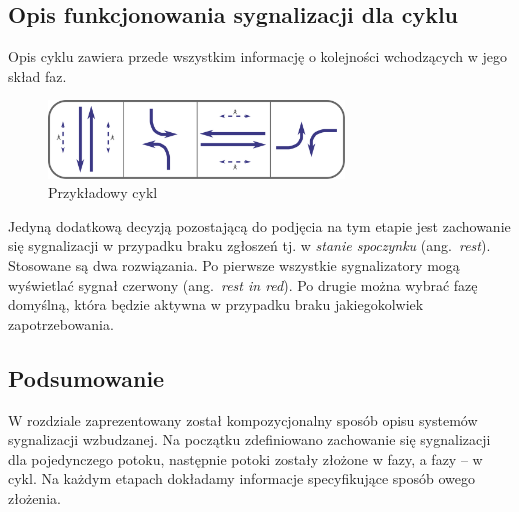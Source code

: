\documentclass{pracamgr}
\newcommand{\ang}[1]{(ang.~\emph{#1})}
\theoremstyle{plain}
\begin{document}
\subsection{Opis funkcjonowania sygnalizacji dla cyklu} Opis cyklu
zawiera przede wszystkim informację o kolejności wchodzących w jego
skład faz.
\begin{figure}[ht] \centering
  \includegraphics[width=0.7\textwidth]{img/signals-cycle-example}
  \caption{Przykładowy cykl}
\end{figure}
Jedyną dodatkową decyzją pozostającą do podjęcia na tym etapie jest
zachowanie się sygnalizacji w przypadku braku zgłoszeń tj. w
\emph{stanie spoczynku} \ang{rest}. Stosowane są dwa rozwiązania. Po
pierwsze wszystkie sygnalizatory mogą wyświetlać sygnał czerwony
\ang{rest in red}. Po drugie można wybrać fazę domyślną, która będzie
aktywna w przypadku braku jakiegokolwiek zapotrzebowania.

\subsection{Podsumowanie}

W rozdziale zaprezentowany został kompozycjonalny sposób opisu
systemów sygnalizacji wzbudzanej. Na początku zdefiniowano zachowanie
się sygnalizacji dla pojedynczego potoku, następnie potoki zostały
złożone w fazy, a fazy -- w cykl. Na każdym etapach dokładamy
informacje specyfikujące sposób owego złożenia.
\end{document}
